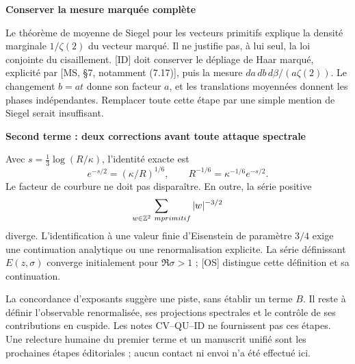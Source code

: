 \documentclass[11pt,a4paper]{article}
\newcommand{\subhead}[1]{{\bfseries\color{navy}#1}\par}
\begin{document}
\subhead{Conserver la mesure marquée complète}
Le théorème de moyenne de Siegel pour les vecteurs primitifs explique la densité marginale $1/\zeta(2)$ du vecteur marqué. Il ne justifie pas, à lui seul, la loi conjointe du cisaillement. [ID] doit conserver le dépliage de Haar marqué, explicité par [MS, §7, notamment (7.17)], puis la mesure $da\,db\,d\beta/(a\zeta(2))$. Le changement $b=at$ donne son facteur $a$, et les translations moyennées donnent les phases indépendantes. Remplacer toute cette étape par une simple mention de Siegel serait insuffisant.

\subhead{Second terme : deux corrections avant toute attaque spectrale}
Avec $s=\frac13\log(R/\kappa)$, l'identité exacte est
\[
 e^{-s/2}=(\kappa/R)^{1/6},\qquad
 R^{-1/6}=\kappa^{-1/6}e^{-s/2}.\tag{13}
\]
Le facteur de courbure ne doit pas disparaître. En outre, la série positive
\[
 \sum_{w\in\mathbb Z^2\ {
m primitif}}|w|^{-3/2}
\]
diverge. L'identification à une valeur finie d'Eisenstein de paramètre $3/4$ exige une continuation analytique ou une renormalisation explicite. La série définissant $E(z,\sigma)$ converge initialement pour $\Re\sigma>1$ ; [OS] distingue cette définition et sa continuation.

La concordance d'exposants suggère une piste, sans établir un terme $B$. Il reste à définir l'observable renormalisée, ses projections spectrales et le contrôle de ses contributions en cuspide. Les notes CV--QU--ID ne fournissent pas ces étapes. Une relecture humaine du premier terme et un manuscrit unifié sont les prochaines étapes éditoriales ; aucun contact ni envoi n'a été effectué ici.
\end{document}
